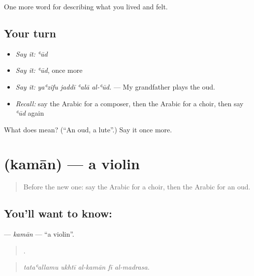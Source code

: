 \begin{grammarlens}[title={What you've built}]
One more word for describing what you lived and felt.
\end{grammarlens}

\subsection*{Your turn}
\begin{itemize}
\raggedright
  \item \emph{Say it:} \emph{ʿūd}
  \item \emph{Say it:} \emph{ʿūd}, once more
  \item \emph{Say it:} \emph{yaʿzifu jaddī ʿalā al-ʿūd.} — My grandfather plays the oud.
  \item \emph{Recall:} say the Arabic for a composer, then the Arabic for a choir, then say \emph{ʿūd} again
\end{itemize}

\begin{tcolorbox}[breakable,colback=teal!4,colframe=teal!35!black,title={Before you move on}]
What does  mean? (\textquotedblleft{}An oud, a lute\textquotedblright{}.) Say it once more.
\end{tcolorbox}
\section[\texorpdfstring{\ar{كمان} (kamān)}{كمان (kamān)}]{ (kamān) — a violin}

\label{lesson:AR-C544-kaman}



\begin{quote}
Before the new one: say the Arabic for a choir, then the Arabic for an oud.
\end{quote}

\subsection*{You'll want to know: }
\textbf{} — \emph{kamān} — \textquotedblleft{}a violin\textquotedblright{}.

\begin{quote}
    .
\end{quote}

\begin{quote}
\emph{tataʿallamu ukhtī al-kamān fī al-madrasa.}
\end{quote}

